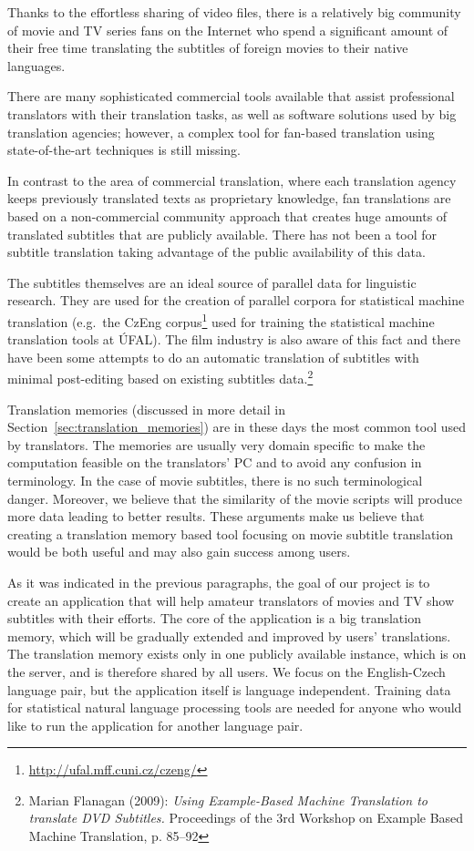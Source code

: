 Thanks to the effortless sharing of video files, there is a relatively big community of movie and TV series fans on the Internet who spend a significant amount of their free time translating the subtitles of foreign movies to their native languages.


There are many sophisticated commercial tools available that assist professional translators with their translation tasks, as well as software solutions used by big translation agencies; however, a complex tool for fan-based translation using  state-of-the-art techniques is still missing.

In contrast to the area of commercial translation, where each translation agency keeps previously translated texts as proprietary knowledge, fan translations are based on a non-commercial community approach that creates huge amounts of translated subtitles that are publicly available. There has not been a tool for subtitle translation taking advantage of the public availability of this data.

The subtitles themselves are an ideal source of parallel data for linguistic research. They are used for the creation of  parallel corpora for statistical machine translation (e.g.\ the CzEng corpus\footnote{\url{http://ufal.mff.cuni.cz/czeng/}} used for training the statistical machine translation tools at ÚFAL). The film industry is also aware of this fact and there have been some attempts to do an automatic translation of  subtitles  with minimal post-editing based on existing subtitles data.\footnote{Marian Flanagan (2009): \emph{Using Example-Based Machine Translation to translate DVD Subtitles.} Proceedings of the 3rd Workshop on Example Based Machine Translation, p. 85–92}

Translation memories (discussed in more detail in Section~\ref{sec:translation_memories}) are in these days the most common tool used by translators. The memories are usually very domain specific to make the computation feasible on the translators' PC and to avoid any confusion in terminology. In the case of movie subtitles, there is no such terminological danger. Moreover, we believe that the similarity of the movie scripts will produce more data leading to better results. These arguments make us believe that creating a translation memory based tool focusing on movie subtitle translation would be both useful and may also gain success among users.

As it was indicated in the previous paragraphs, the goal of our project is to create an application that will help amateur translators of movies and TV show subtitles with their efforts. The core of the application is a big translation memory, which will be gradually extended and improved by users' translations. The translation memory exists only in one publicly available instance, which is on the server, and is therefore shared by all users. We focus on the English-Czech language pair, but the application itself is language independent. Training data for statistical natural language processing tools are needed for anyone who would like to run the application for another language pair.

